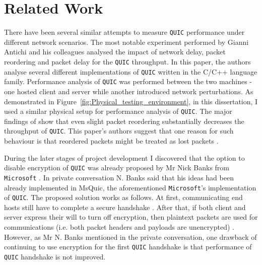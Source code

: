 \documentclass[12pt,a4paper,twoside,openright]{report}
\begin{document}
\section{Related Work}
There have been several similar attempts to measure \texttt{QUIC} performance under different network scenarios. 
The most notable experiment performed by Gianni Antichi and his colleagues \cite{Making_QUIC_Quicker} analysed the impact of network delay, packet reordering and packet delay for the \texttt{QUIC} throughput. 
In this paper, the authors analyse several different implementations of \texttt{QUIC} written in the C/C++ language family.
Performance analysis of \texttt{QUIC} was performed between the two machines - one hosted client and server while another introduced network perturbations.
As demonstrated in Figure~\ref{fig:Physical_testing_environment}, in this dissertation, I used a similar physical setup for performance analysis of \texttt{QUIC}.
The major findings of \cite{Making_QUIC_Quicker} show that even slight packet reordering substantially decreases the throughput of \texttt{QUIC}.
This paper's authors suggest that one reason for such behaviour is that reordered packets might be treated as lost packets \cite{Making_QUIC_Quicker}. 


During the later stages of project development I discovered that the option to disable encryption of \texttt{QUIC} was already proposed by Mr Nick Banks from \texttt{Microsoft} \cite{banks-quic-disable-encryption-00}.
In private conversation N. Banks said that his ideas had been already implemented in MsQuic, the aforementioned \texttt{Microsoft}'s implementation of \texttt{QUIC}.
The proposed solution works as follows.
At first, communicating end hosts still have to complete a secure handshake \cite{banks-quic-disable-encryption-00}.
After that, if both client and server express their will to turn off encryption, then plaintext packets are used for communications (i.e. both packet headers and payloads are unencrypted) \cite{banks-quic-disable-encryption-00}.
However, as Mr N. Banks mentioned in the private conversation, one drawback of continuing to use encryption for the first \texttt{QUIC} handshake is that performance of \texttt{QUIC} handshake is not improved.
\end{document}
